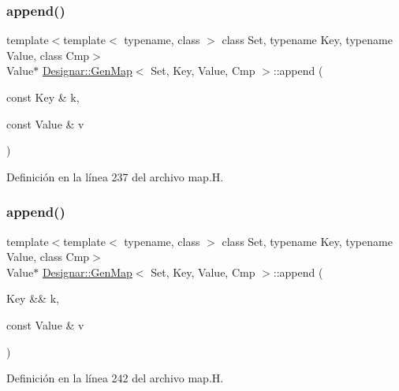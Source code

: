 \subsubsection{\texorpdfstring{append()}{append()}\hspace{0.1cm}{\footnotesize\ttfamily [1/4]}}
{\footnotesize\ttfamily template$<$template$<$ typename, class $>$ class Set, typename Key, typename Value, class Cmp$>$ \\
Value$\ast$ \hyperlink{class_designar_1_1_gen_map}{Designar\+::\+Gen\+Map}$<$ Set, Key, Value, Cmp $>$\+::append (\begin{DoxyParamCaption}\item[{const Key \&}]{k,  }\item[{const Value \&}]{v }\end{DoxyParamCaption})\hspace{0.3cm}{\ttfamily [inline]}}



Definición en la línea 237 del archivo map.\+H.

\mbox{\label{class_designar_1_1_gen_map_aeee7a9267c7c54044e7dca399658d9a7}} 
\subsubsection{\texorpdfstring{append()}{append()}\hspace{0.1cm}{\footnotesize\ttfamily [2/4]}}
{\footnotesize\ttfamily template$<$template$<$ typename, class $>$ class Set, typename Key, typename Value, class Cmp$>$ \\
Value$\ast$ \hyperlink{class_designar_1_1_gen_map}{Designar\+::\+Gen\+Map}$<$ Set, Key, Value, Cmp $>$\+::append (\begin{DoxyParamCaption}\item[{Key \&\&}]{k,  }\item[{const Value \&}]{v }\end{DoxyParamCaption})\hspace{0.3cm}{\ttfamily [inline]}}



Definición en la línea 242 del archivo map.\+H.

\mbox{\label{class_designar_1_1_gen_map_a2c148d9d32bc86315444f1026d9ef482}} 

